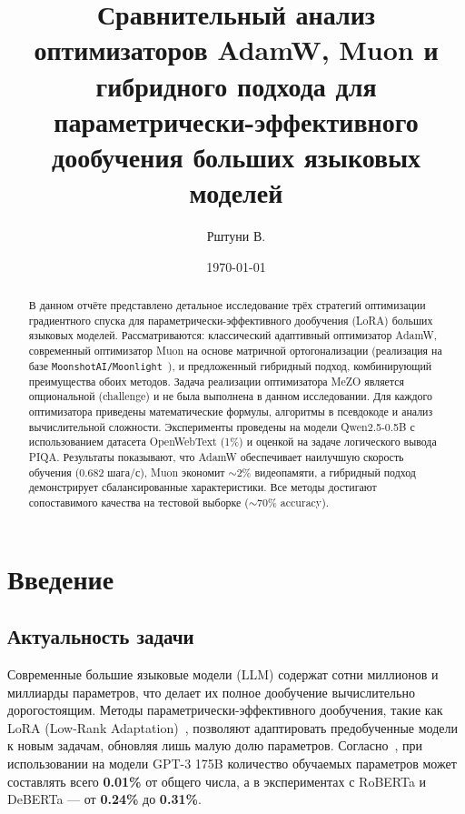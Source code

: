 \documentclass[a4paper,12pt]{article}
\title{Сравнительный анализ оптимизаторов AdamW, Muon и гибридного подхода для параметрически-эффективного дообучения больших языковых моделей}
\author{Рштуни В.}
\date{\today}
\begin{document}
\maketitle

\begin{abstract}
В данном отчёте представлено детальное исследование трёх стратегий оптимизации градиентного спуска для параметрически-эффективного дообучения (LoRA) больших языковых моделей. Рассматриваются: классический адаптивный оптимизатор AdamW, современный оптимизатор Muon на основе матричной ортогонализации (реализация на базе \texttt{MoonshotAI/Moonlight}~\cite{moonshot2024muon}), и предложенный гибридный подход, комбинирующий преимущества обоих методов. Задача реализации оптимизатора MeZO является опциональной (challenge) и не была выполнена в данном исследовании. Для каждого оптимизатора приведены математические формулы, алгоритмы в псевдокоде и анализ вычислительной сложности. Эксперименты проведены на модели Qwen2.5-0.5B с использованием датасета OpenWebText (1\%) и оценкой на задаче логического вывода PIQA. Результаты показывают, что AdamW обеспечивает наилучшую скорость обучения (0.682 шага/с), Muon экономит $\sim$2\% видеопамяти, а гибридный подход демонстрирует сбалансированные характеристики. Все методы достигают сопоставимого качества на тестовой выборке ($\sim$70\% accuracy).
\end{abstract}
\newpage

\tableofcontents
\newpage

\section{Введение}
\label{sec:intro}

\subsection{Актуальность задачи}

Современные большие языковые модели (LLM) содержат сотни миллионов и миллиарды параметров, что делает их полное дообучение вычислительно дорогостоящим. Методы параметрически-эффективного дообучения, такие как LoRA (Low-Rank Adaptation)~\cite{hu2021lora}, позволяют адаптировать предобученные модели к новым задачам, обновляя лишь малую долю параметров. Согласно~\cite{hu2021lora}, при использовании на модели GPT-3 175B количество обучаемых параметров может составлять всего \textbf{0.01\%} от общего числа, а в экспериментах с RoBERTa и DeBERTa --- от \textbf{0.24\%} до \textbf{0.31\%}.
\end{document}
